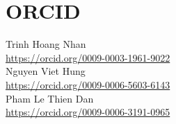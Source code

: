 \documentclass{ws-vjcs}
\begin{document}
\section*{ORCID}
\noindent Trinh Hoang Nhan\\
\url{https://orcid.org/0009-0003-1961-9022}\\
Nguyen Viet Hung\\
\url{https://orcid.org/0009-0006-5603-6143}\\
Pham Le Thien Dan\\
\url{https://orcid.org/0009-0006-3191-0965}



\end{document}
